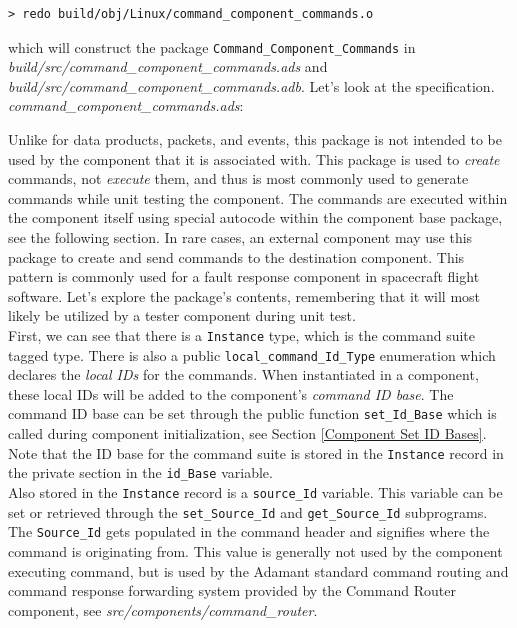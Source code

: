 \vspace{5mm} %
\begin{verbatim}
> redo build/obj/Linux/command_component_commands.o
\end{verbatim}
\vspace{5mm} %

which will construct the package \texttt{Command\_Component\_Commands} in \textit{build/src/command\_component\_commands.ads} and \textit{build/src/command\_component\_commands.adb}. Let's look at the specification. \\

\textit{command\_component\_commands.ads}:

Unlike for data products, packets, and events, this package is not intended to be used by the component that it is associated with. This package is used to \textit{create} commands, not \textit{execute} them, and thus is most commonly used to generate commands while unit testing the component. The commands are executed within the component itself using special autocode within the component base package, see the following section. In rare cases, an external component may use this package to create and send commands to the destination component. This pattern is commonly used for a fault response component in spacecraft flight software. Let's explore the package's contents, remembering that it will most likely be utilized by a tester component during unit test. \\

First, we can see that there is a \texttt{Instance} type, which is the command suite tagged type. There is also a public \texttt{local\_command\_Id\_Type} enumeration which declares the \textit{local IDs} for the commands. When instantiated in a component, these local IDs will be added to the component's \textit{command ID base}. The command ID base can be set through the public function \texttt{set\_Id\_Base} which is called during component initialization, see Section \ref{Component Set ID Bases}. Note that the ID base for the command suite is stored in the \texttt{Instance} record in the private section in the \texttt{id\_Base} variable. \\

Also stored in the \texttt{Instance} record is a \texttt{source\_Id} variable. This variable can be set or retrieved through the \texttt{set\_Source\_Id} and \texttt{get\_Source\_Id} subprograms. The \texttt{Source\_Id} gets populated in the command header and signifies where the command is originating from. This value is generally not used by the component executing command, but is used by the Adamant standard command routing and command response forwarding system provided by the Command Router component, see \textit{src/components/command\_router}. \\

